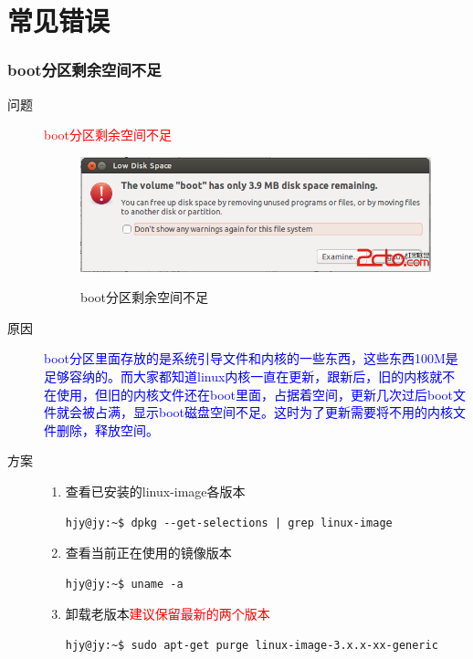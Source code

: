 \part{常见错误}
\section{boot分区剩余空间不足}
\begin{description}
\item[问题] \textcolor{red}{boot分区剩余空间不足}\\
\begin{figure}[!htbp]
	\centering
	\caption{boot分区剩余空间不足}  
		\includegraphics[scale=0.35]{figs/boot_space.png}
    	\label{fig:boot_space}
\end{figure}
\item[原因] \textcolor{blue}{
boot分区里面存放的是系统引导文件和内核的一些东西，这些东西100M是足够容纳的。而大家都知道linux内核一直在更新，跟新后，旧的内核就不在使用，但旧的内核文件还在boot里面，占据着空间，更新几次过后boot文件就会被占满，显示boot磁盘空间不足。这时为了更新需要将不用的内核文件删除，释放空间。
}
\item[方案]
\begin{enumerate}
\item 查看已安装的linux-image各版本\\
\begin{lstlisting}[style=BASH]
hjy@jy:~$ dpkg --get-selections | grep linux-image
\end{lstlisting}

\item 查看当前正在使用的镜像版本\\
\begin{lstlisting}[style=BASH]
hjy@jy:~$ uname -a
\end{lstlisting}

\item 卸载老版本\textcolor{red}{建议保留最新的两个版本}
\begin{lstlisting}[style=BASH]
hjy@jy:~$ sudo apt-get purge linux-image-3.x.x-xx-generic
\end{lstlisting}

\end{enumerate}

\end{description}
